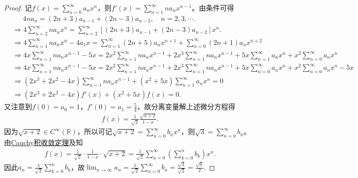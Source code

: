 \documentclass[../../main.tex]{subfiles}%
\begin{document}
\begin{proof}
记$f(x) = \sum_{n=0}^{\infty} a_n x^n$，则$f'(x) = \sum_{n=1}^{\infty} n a_n x^{n-1}$。由条件可得
\begin{align*}
&\quad \,\,\, 4n a_n = (2n+3)a_{n-1} + (2n-3)a_{n-2}, \quad n=2,3,\cdots .
\\
&\Rightarrow 4\sum_{n=2}^{\infty} n a_n x^n = \sum_{n=2}^{\infty} \left[ (2n+3)a_{n-1} + (2n-3)a_{n-2} \right] x^n.
\\
&\Rightarrow 4\sum_{n=1}^{\infty} n a_n x^n - 4a_1 x = \sum_{n=1}^{\infty} (2n+5)a_n x^{n+1} + \sum_{n=0}^{\infty} (2n+1)a_n x^{n+2}
\\
&\Rightarrow 4x\sum_{n=1}^{\infty} n a_n x^{n-1} - 5x = 2x^2\sum_{n=1}^{\infty} n a_n x^{n-1} + 2x^3\sum_{n=1}^{\infty} n a_n x^{n-1} + 5x\sum_{n=1}^{\infty} a_n x^n + x^2\sum_{n=0}^{\infty} a_n x^n
\\
&\Rightarrow 4x\sum_{n=1}^{\infty} n a_n x^{n-1} - 5x = 2x^2\sum_{n=1}^{\infty} n a_n x^{n-1} + 2x^3\sum_{n=1}^{\infty} n a_n x^{n-1} + 5x\sum_{n=0}^{\infty} a_n x^n + x^2\sum_{n=0}^{\infty} a_n x^n - 5x
\\
&\Rightarrow (2x^3 + 2x^2 - 4x) \sum_{n=1}^{\infty} n a_n x^{n-1} + (x^2 + 5x) \sum_{n=1}^{\infty} a_n x^n = 0
\\
&\Rightarrow (2x^3 + 2x^2 - 4x) f'(x) + (x^2 + 5x) f(x) = 0.
\end{align*}
又注意到$f(0) = a_0 = 1$，$f'(0) = a_1 = \frac{5}{4}$，故分离变量解上述微分方程得
\begin{align*}
f(x) = \frac{1}{\sqrt{2}} \frac{\sqrt{x+2}}{1-x}.
\end{align*}
因为$\sqrt{x+2} \in C^{\infty}(\mathbb{R})$，所以可记$\sqrt{x+2} = \sum_{n=0}^{\infty} b_n x^n$，则$\sqrt{3} = \sum_{n=0}^{\infty} b_n$。由\hyperref[theorem:Cauchy积收敛定理]{Cauchy积收敛定理}及知
\begin{align*}
f(x) = \frac{1}{\sqrt{2}} \cdot \frac{1}{1-x} \cdot \sqrt{x+2} = \frac{1}{\sqrt{2}} \sum_{n=0}^{\infty} \left( \sum_{k=0}^n b_k \right) x^n.
\end{align*}
因此$a_n = \frac{1}{\sqrt{2}} \sum_{k=0}^n b_k$，故$\lim_{n\rightarrow \infty} a_n = \frac{1}{\sqrt{2}} \sum_{n=0}^{\infty} b_n = \frac{\sqrt{3}}{\sqrt{2}} = \frac{\sqrt{6}}{2}.$
\end{proof}
\end{document}
